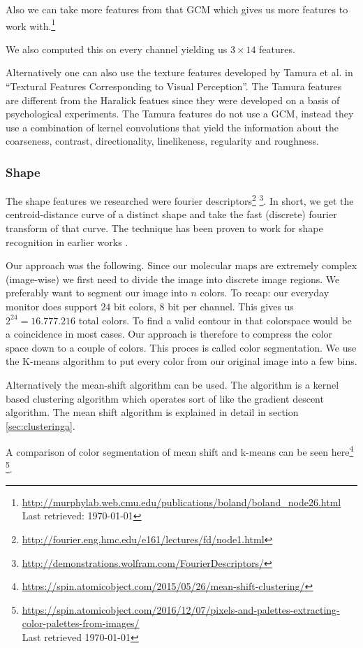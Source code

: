 \documentclass[journal]{vgtc}       %
\begin{document}
Also we can take more features from that GCM which gives us more features to work with.\footnote{\url{http://murphylab.web.cmu.edu/publications/boland/boland_node26.html} \\ Last retrieved: \today}

We also computed this on every channel yielding us \(3 \times 14 \) features.

Alternatively one can also use the  texture features developed by Tamura et al.  in ``Textural Features Corresponding to Visual Perception''\cite{tamura}. The Tamura features are different from the Haralick featues since they were developed on a basis of psychological experiments. The Tamura features do not use a GCM, instead they use a combination of kernel convolutions that yield  the information about the coarseness, contrast, directionality, linelikeness, regularity and roughness.

\subsubsection{Shape}

The shape features we researched were  fourier descriptors\footnote{\url{http://fourier.eng.hmc.edu/e161/lectures/fd/node1.html} } \footnote{\url{http://demonstrations.wolfram.com/FourierDescriptors/}}. In short, we get the centroid-distance curve of a distinct shape and take the fast (discrete) fourier transform of that curve. The technique has been proven to work for shape recognition  in earlier works \cite{fourierd}.  

Our approach was the following.  Since our molecular maps are extremely complex (image-wise) we first need to divide the image into discrete image regions.  We preferably want to segment our image into $n$ colors. To recap: our everyday monitor does support \(24\) bit colors, \(8 \) bit per channel. This gives us \(2^{24}=16.777.216 \) total colors.
To find a valid contour in that colorspace would be a coincidence in most cases.
Our approach is therefore to compress the color space down to a couple of colors.
This proces is called color segmentation. We use the K-means algorithm to put every color from our original image into a few bins.

Alternatively the mean-shift algorithm can be used. The algorithm is a kernel based clustering algorithm which operates sort of like the gradient descent algorithm. The mean shift algorithm is explained in detail in section \ref{sec:clusteringa}.

A comparison of color segmentation of mean shift and  k-means can be seen here\footnote{\url{https://spin.atomicobject.com/2015/05/26/mean-shift-clustering/}} 
\footnote{\url{https://spin.atomicobject.com/2016/12/07/pixels-and-palettes-extracting-color-palettes-from-images/} \\ Last retrieved \today}. 
\end{document}
